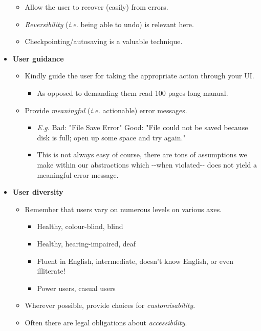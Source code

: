 \documentclass[a4paper]{article}
\providecommand{\tightlist}{%
  \setlength{\itemsep}{0pt}\setlength{\parskip}{0pt}}
\begin{document}
\begin{itemize}
  \begin{itemize}
  \tightlist
  \item
    Allow the user to recover (easily) from errors.
  \item
    \emph{Reversibility} (\emph{i.e.} being able to undo) is relevant
    here.
  \item
    Checkpointing/autosaving is a valuable technique.
  \end{itemize}
\item
  \textbf{User guidance}

  \begin{itemize}
  \tightlist
  \item
    Kindly guide the user for taking the appropriate action through your
    UI.

    \begin{itemize}
    \tightlist
    \item
      As opposed to demanding them read 100 pages long manual.
    \end{itemize}
  \item
    Provide \emph{meaningful} (\emph{i.e.} actionable) error messages.

    \begin{itemize}
    \tightlist
    \item
      \emph{E.g.} Bad: "File Save Error" Good: "File could not be saved
      because disk is full; open up some space and try again."
    \item
      This is not always easy of course, there are tons of assumptions
      we make within our abstractions which -\/-when violated-\/- does
      not yield a meaningful error message.
    \end{itemize}
  \end{itemize}
\item
  \textbf{User diversity}

  \begin{itemize}
  \tightlist
  \item
    Remember that users vary on numerous levels on various axes.

    \begin{itemize}
    \tightlist
    \item
      Healthy, colour-blind, blind
    \item
      Healthy, hearing-impaired, deaf
    \item
      Fluent in English, intermediate, doesn't know English, or even
      illiterate!
    \item
      Power users, casual users
    \end{itemize}
  \item
    Wherever possible, provide choices for \emph{customisability}.
  \item
    Often there are legal obligations about \emph{accessibility}.
  \end{itemize}
\end{itemize}
\end{document}
